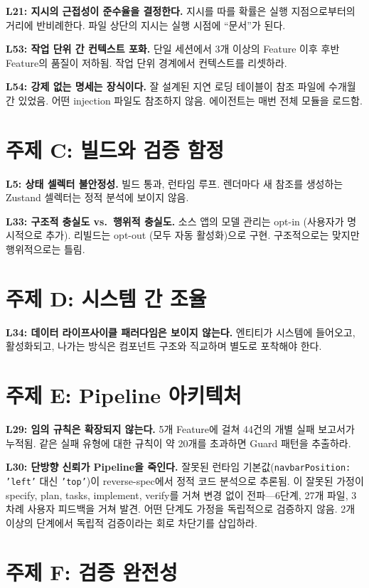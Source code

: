\documentclass[11pt,a4paper,openright,twoside]{report}
\begin{document}
\textbf{L21: 지시의 근접성이 준수율을 결정한다.} 지시를 따를 확률은 실행 지점으로부터의 거리에 반비례한다. 파일 상단의 지시는 실행 시점에 ``문서''가 된다.

\textbf{L53: 작업 단위 간 컨텍스트 포화.} 단일 세션에서 3개 이상의 Feature 이후 후반 Feature의 품질이 저하됨. 작업 단위 경계에서 컨텍스트를 리셋하라.

\textbf{L54: 강제 없는 명세는 장식이다.} 잘 설계된 지연 로딩 테이블이 참조 파일에 수개월간 있었음. 어떤 injection 파일도 참조하지 않음. 에이전트는 매번 전체 모듈을 로드함.

\section{주제 C: 빌드와 검증 함정}

\textbf{L5: 상태 셀렉터 불안정성.} 빌드 통과, 런타임 루프. 렌더마다 새 참조를 생성하는 Zustand 셀렉터는 정적 분석에 보이지 않음.

\textbf{L33: 구조적 충실도 vs.\ 행위적 충실도.} 소스 앱의 모델 관리는 opt-in (사용자가 명시적으로 추가). 리빌드는 opt-out (모두 자동 활성화)으로 구현. 구조적으로는 맞지만 행위적으로는 틀림.

\section{주제 D: 시스템 간 조율}

\textbf{L34: 데이터 라이프사이클 패러다임은 보이지 않는다.} 엔티티가 시스템에 들어오고, 활성화되고, 나가는 방식은 컴포넌트 구조와 직교하며 별도로 포착해야 한다.

\section{주제 E: Pipeline 아키텍처}

\textbf{L29: 임의 규칙은 확장되지 않는다.} 5개 Feature에 걸쳐 44건의 개별 실패 보고서가 누적됨. 같은 실패 유형에 대한 규칙이 약 20개를 초과하면 Guard 패턴을 추출하라.

\textbf{L30: 단방향 신뢰가 Pipeline을 죽인다.} 잘못된 런타임 기본값(\texttt{navbarPosition: 'left'} 대신 \texttt{'top'})이 reverse-spec에서 정적 코드 분석으로 추론됨. 이 잘못된 가정이 specify, plan, tasks, implement, verify를 거쳐 변경 없이 전파---6단계, 27개 파일, 3차례 사용자 피드백을 거쳐 발견. 어떤 단계도 가정을 독립적으로 검증하지 않음. 2개 이상의 단계에서 독립적 검증이라는 회로 차단기를 삽입하라.

\section{주제 F: 검증 완전성}
\end{document}
